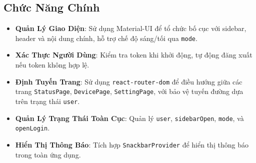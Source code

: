         \subsection{Chức Năng Chính}
            \begin{itemize}
                \item \textbf{Quản Lý Giao Diện}: Sử dụng Material-UI để tổ chức bố cục với sidebar, header và nội dung chính, hỗ trợ chế độ sáng/tối qua \texttt{mode}.
                \item \textbf{Xác Thực Người Dùng}: Kiểm tra token khi khởi động, tự động đăng xuất nếu token không hợp lệ.
                \item \textbf{Định Tuyến Trang}: Sử dụng \texttt{react-router-dom} để điều hướng giữa các trang \texttt{StatusPage}, \texttt{DevicePage}, \texttt{SettingPage}, với bảo vệ tuyến đường dựa trên trạng thái \texttt{user}.
                \item \textbf{Quản Lý Trạng Thái Toàn Cục}: Quản lý \texttt{user}, \texttt{sidebarOpen}, \texttt{mode}, và \texttt{openLogin}.
                \item \textbf{Hiển Thị Thông Báo}: Tích hợp \texttt{SnackbarProvider} để hiển thị thông báo trong toàn ứng dụng.
            \end{itemize}

                

           
                
                
    
                            
